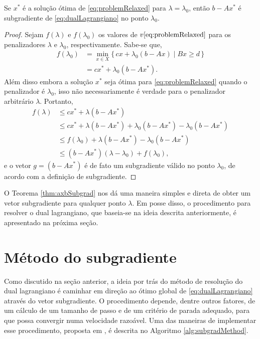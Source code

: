 {\begin{theorem}
	\label{thm:axbSubgrad}
	Se $x^*$ é a solução ótima de \eqref{eq:problemRelaxed} para $\lambda = \lambda_0$, então $b - Ax^*$ é subgradiente de \eqref{eq:dualLagrangiano} no ponto $\lambda_0$.
\end{theorem}
\begin{proof}
Sejam $f(\lambda)$ e $f(\lambda_0)$ os valores de $v\eqref{eq:problemRelaxed}$ para os penalizadores $\lambda$ e $\lambda_0$, respectivamente. Sabe-se que,
\begin{align*}
	f(\lambda_0) &= \min_{x\in X}\{\, cx + \lambda_0(b - Ax) \mid Bx \geq d \, \}\\
	 &= cx^* + \lambda_0 (b - Ax^*).
\end{align*}
Além disso embora a solução $x^*$ seja ótima para \eqref{eq:problemRelaxed} quando o penalizador é $\lambda_0$, isso não necessariamente é verdade para o penalizador arbitrário $\lambda$. Portanto,
\begin{align*}
	f(\lambda) & \leq cx^* + \lambda (b - Ax^*) \\
	& \leq cx^* + \lambda(b - Ax^*) + \lambda_0(b - Ax^*) - \lambda_0(b - Ax^*) \\
	& \leq f(\lambda_0) + \lambda(b - Ax^*) - \lambda_0 (b - Ax^*) \\
	& \leq (b - Ax^*) (\lambda - \lambda_0) + f(\lambda_0), 
\end{align*}
e o vetor $g = (b - Ax^*)$ é de fato um subgradiente válido no ponto $\lambda_0$, de acordo com a definição de subgradiente.
\end{proof}

O Teorema \ref{thm:axbSubgrad} nos dá uma maneira simples e direta de obter um vetor subgradiente para qualquer ponto $\lambda$. Em posse disso, o procedimento para resolver o dual lagrangiano, que baseia-se na ideia descrita anteriormente, é apresentado na próxima seção.

\section{Método do subgradiente}

Como discutido na seção anterior, a ideia por trás do método de resolução do dual lagrangiano é caminhar em direção ao ótimo global de \eqref{eq:dualLagrangiano} através do vetor subgradiente. O procedimento depende, dentre outros fatores, de um cálculo de um tamanho de passo e de um critério de parada adequado, para que possa convergir numa velocidade razoável. Uma das maneiras de implementar esse procedimento, proposta em , é descrita no Algoritmo \ref{alg:subgradMethod}.

}
